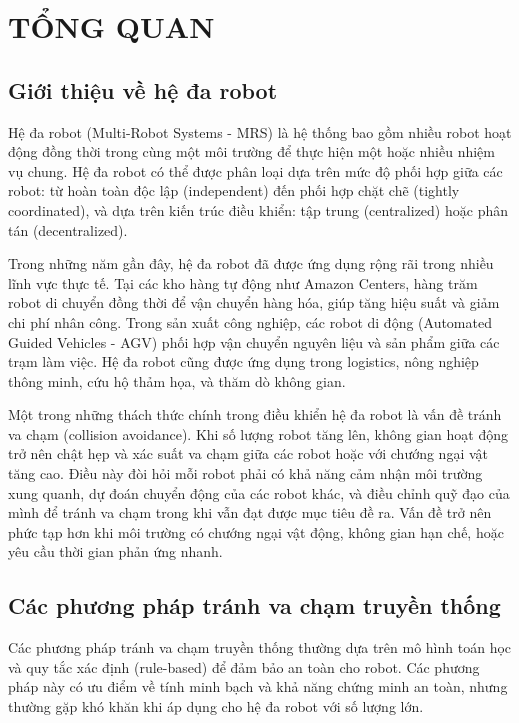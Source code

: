 
\chapter{TỔNG QUAN}
\label{chap:overview}

\section{Giới thiệu về hệ đa robot}
\label{sec:multi_robot_intro}

Hệ đa robot (Multi-Robot Systems - MRS) là hệ thống bao gồm nhiều robot hoạt động đồng thời trong cùng một môi trường để thực hiện một hoặc nhiều nhiệm vụ chung. Hệ đa robot có thể được phân loại dựa trên mức độ phối hợp giữa các robot: từ hoàn toàn độc lập (independent) đến phối hợp chặt chẽ (tightly coordinated), và dựa trên kiến trúc điều khiển: tập trung (centralized) hoặc phân tán (decentralized).

Trong những năm gần đây, hệ đa robot đã được ứng dụng rộng rãi trong nhiều lĩnh vực thực tế. Tại các kho hàng tự động như Amazon Centers, hàng trăm robot di chuyển đồng thời để vận chuyển hàng hóa, giúp tăng hiệu suất và giảm chi phí nhân công. Trong sản xuất công nghiệp, các robot di động (Automated Guided Vehicles - AGV) phối hợp vận chuyển nguyên liệu và sản phẩm giữa các trạm làm việc. Hệ đa robot cũng được ứng dụng trong logistics, nông nghiệp thông minh, cứu hộ thảm họa, và thăm dò không gian.

Một trong những thách thức chính trong điều khiển hệ đa robot là vấn đề tránh va chạm (collision avoidance). Khi số lượng robot tăng lên, không gian hoạt động trở nên chật hẹp và xác suất va chạm giữa các robot hoặc với chướng ngại vật tăng cao. Điều này đòi hỏi mỗi robot phải có khả năng cảm nhận môi trường xung quanh, dự đoán chuyển động của các robot khác, và điều chỉnh quỹ đạo của mình để tránh va chạm trong khi vẫn đạt được mục tiêu đề ra. Vấn đề trở nên phức tạp hơn khi môi trường có chướng ngại vật động, không gian hạn chế, hoặc yêu cầu thời gian phản ứng nhanh.

\section{Các phương pháp tránh va chạm truyền thống}
\label{sec:traditional_methods}

Các phương pháp tránh va chạm truyền thống thường dựa trên mô hình toán học và quy tắc xác định (rule-based) để đảm bảo an toàn cho robot. Các phương pháp này có ưu điểm về tính minh bạch và khả năng chứng minh an toàn, nhưng thường gặp khó khăn khi áp dụng cho hệ đa robot với số lượng lớn.

